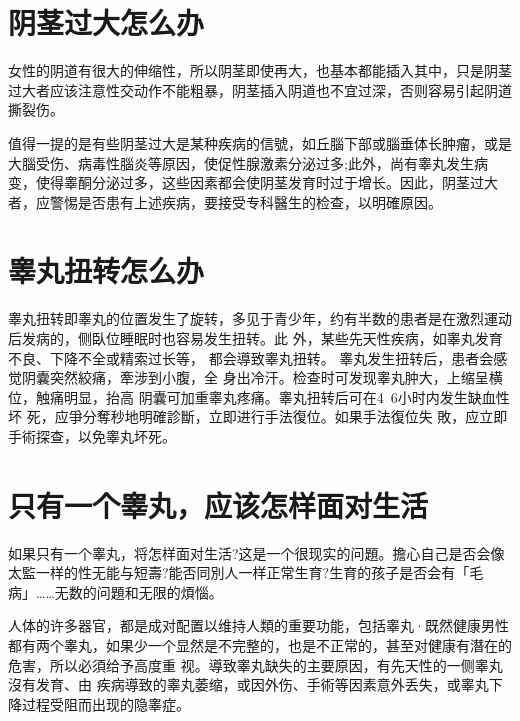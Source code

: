 \documentclass[12pt,UTF8]{ctexbook}
\begin{document}
\section{阴茎过大怎么办}

女性的阴道有很大的伸缩性，所以阴茎即使再大，也基本都能插入其中，只是阴茎过大者应该注意性交动作不能粗暴，阴茎插入阴道也不宜过深，否则容易引起阴道撕裂伤。

值得一提的是有些阴茎过大是某种疾病的信號，如丘腦下部或腦垂体长肿瘤，或是大腦受伤、病毒性腦炎等原因，使促性腺激素分泌过多;此外，尚有睾丸发生病变，使得睾酮分泌过多，这些因素都会使阴茎发育时过于增长。因此，阴茎过大者，应警惕是否患有上述疾病，要接受专科醫生的检查，以明確原因。

\section{睾丸扭转怎么办}

睾丸扭转即睾丸的位置发生了旋转，多见于青少年，约有半数的患者是在激烈運动后发病的，侧臥位睡眠时也容易发生扭转。此
外，某些先天性疾病，如睾丸发育不良、下降不全或精索过长等，
都会導致睾丸扭转。
睾丸发生扭转后，患者会感觉阴囊突然絞痛，牽涉到小腹，全
身出冷汗。检查时可发现睾丸肿大，上缩呈横位，触痛明显，抬高
阴囊可加重睾丸疼痛。睾丸扭转后可在4~6小时内发生缺血性坏
死，应爭分奪秒地明確診斷，立即进行手法復位。如果手法復位失
敗，应立即手術探查，以免睾丸坏死。

\section{只有一个睾丸，应该怎样面对生活}

如果只有一个睾丸，将怎样面对生活?这是一个很现实的问題。擔心自己是否会像太監一样的性无能与短壽?能否同別人一样正常生育?生育的孩子是否会有「毛病」……无数的问題和无限的煩惱。

人体的许多器官，都是成对配置以维持人類的重要功能，包括睾丸·既然健康男性都有两个睾丸，如果少一个显然是不完整的，也是不正常的，甚至对健康有潛在的危害，所以必須给予高度重
视。導致睾丸缺失的主要原因，有先天性的一侧睾丸沒有发育、由
疾病導致的睾丸萎缩，或因外伤、手術等因素意外丢失，或睾丸下
降过程受阻而出现的隐睾症。
\end{document}
